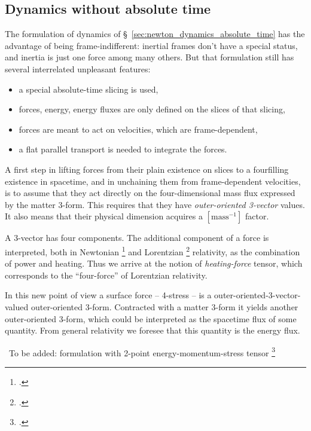 \documentclass[\ifafour a4paper,12pt,\else a5paper,10pt,\fi%
onecolumn,oneside,article,%
british%
]{memoir}
\theoremstyle{remark}
\theoremstyle{innote}
\newcommand*{\citep}{\footcites}
\renewcommand*{\|}[1][]{\nonscript\,#1\vert\nonscript\;\mathopen{}}
\newcommand*{\sect}{\S}%
\newcommand*{\sects}{\S\S}%
\newcommand*{\puzzle}{{\fontencoding{U}\fontfamily{fontawesometwo}\selectfont\symbol{225}}}
\newcommand{\mynote}[1]{ {\color{notecolour}\puzzle\ #1}}
\begin{document}
\subsection{Dynamics without absolute time}
\label{sec:newton_dynamics_without_absolute_time}

The formulation of dynamics of
\sect~\ref{sec:newton_dynamics_absolute_time} has the advantage of being
frame-indifferent: inertial frames don't have a special status, and inertia
is just one force among many others. But that formulation still has several
interrelated unpleasant features:
\begin{itemize}
\item a special absolute-time slicing is used,
\item forces, energy, energy fluxes are only defined on the slices of that
  slicing,
\item forces are meant to act on velocities, which are frame-dependent,
\item a flat parallel transport is needed to integrate the forces.
\end{itemize}

A first step in lifting forces from their plain existence on slices to a
fourfilling existence in spacetime, and in unchaining them from
frame-dependent velocities, is to assume that they act directly on the
four-dimensional mass flux expressed by the matter 3-form. This requires
that they have \emph{outer-oriented 3-vector} values. It also means that
their physical dimension acquires a $[\text{mass}^{-1}]$ factor.

A 3-vector has four components. The additional component of a force is
interpreted, both in Newtonian \citep[\sects~152--154,
288--289]{truesdelletal1960}[\sect~2.3]{grotetal1966} and Lorentzian
\citep{eckart1940c}[\sect~2.3]{grotetal1966}{maugin1978b} relativity, as
the combination of power and heating. Thus we arrive at the notion of
\emph{heating-force} tensor, which corresponds to the \enquote{four-force}
of Lorentzian relativity.

In this new point of view a surface force -- 4-stress -- is a
outer-oriented-3-vector-valued outer-oriented 3-form. Contracted with a
matter 3-form it yields another outer-oriented 3-form, which could be
interpreted as the spacetime flux of some quantity. From general relativity
we foresee that this quantity is the energy flux.

\mynote{To be added: formulation with 2-point energy-momentum-stress tensor \citep[\sect~288]{truesdelletal1960}}
\end{document}
